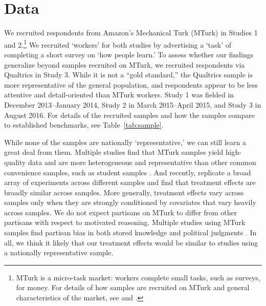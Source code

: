 \documentclass[12pt, letterpaper]{article}
\begin{document}
\section*{Data}

We recruited respondents from Amazon's Mechanical Turk (MTurk) in Studies 1 and 2.\footnote{MTurk is a micro-task market: workers complete small tasks, such as surveys, for money. For details of how samples are recruited on MTurk and general characteristics of the market, see \citet{buhrmester2011} and \citet{berinsky2012}.} We recruited `workers' for both studies by advertising a `task' of completing a short survey on `how people learn.' To assess whether our findings generalize beyond samples recruited on MTurk, we recruited respondents via Qualtrics in Study 3.
While it is not a ``gold standard,'' the Qualtrics sample is more representative of the general population, and respondents appear to be less attentive and detail-oriented than MTurk workers.
Study 1 was fielded in December 2013--January 2014, Study 2 in March 2015--April 2015, and Study 3 in August 2016.
For details of the recruited samples and how the samples compare to established benchmarks, see Table~\ref{tab:sample}.

While none of the samples are nationally `representative,' we can still learn a great deal from them. Multiple studies find that MTurk samples yield high-quality data and are more heterogeneous and representative than other common convenience samples, such as student samples \citep{buhrmester2011, berinsky2012, paolacci2014}. And recently, \citet{mullinix2015} replicate a broad array of experiments across different samples and find that treatment effects are broadly similar across samples. More generally, treatment effects vary across samples only when they are strongly conditioned by covariates that vary heavily across samples. We do not expect partisans on MTurk to differ from other partisans with respect to motivated reasoning. Multiple studies using MTurk samples find partisan bias in both stored knowledge \citep[e.g.,][]{chambers2014, ahler2015, chambers2015, bullock2015} and political judgments \citep[e.g.,][]{arceneaux2013, lyons2014, crawford2015a, crawford2015b, thibodeau2015}. In all, we think it likely that our treatment effects would be similar to studies using a nationally representative sample. 
\end{document}
